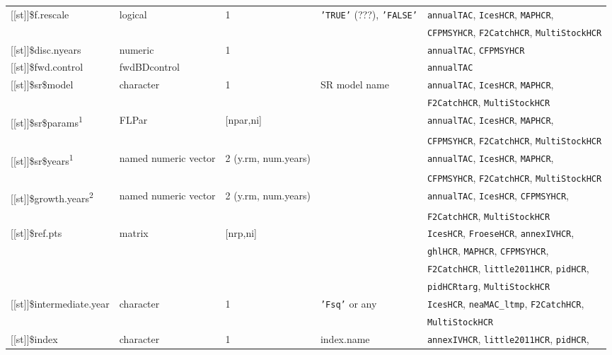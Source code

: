 \begin{landscape}
\begin{table}[!ht]
\begin{footnotesize}
\begin{threeparttable}
\begin{tabular}{lllll}
        {[[st]]}\$f.rescale & logical & 1 & \texttt{'TRUE'} (???), \texttt{'FALSE'} & \texttt{annualTAC}, \texttt{IcesHCR}, \texttt{MAPHCR}, \\
         &  &  &  & \texttt{CFPMSYHCR}, \texttt{F2CatchHCR}, \texttt{MultiStockHCR} \\
        {[[st]]}\$disc.nyears & numeric & 1 &  & \texttt{annualTAC}, \texttt{CFPMSYHCR}  \\
        {[[st]]}\$fwd.control & fwdBDcontrol &  &  & \texttt{annualTAC}  \\
        {[[st]]}\$sr\$model & character &  1 & SR model name  & \texttt{annualTAC}, \texttt{IcesHCR}, \texttt{MAPHCR}, \\
         &  &  &  & \texttt{F2CatchHCR}, \texttt{MultiStockHCR} \\
        {[[st]]}\$sr\$params\textsuperscript{1} & FLPar & [npar,ni]  &  & \texttt{annualTAC}, \texttt{IcesHCR}, \texttt{MAPHCR}, \\
         &  &  &  & \texttt{CFPMSYHCR}, \texttt{F2CatchHCR}, \texttt{MultiStockHCR} \\
         {[[st]]}\$sr\$years\textsuperscript{1} & named numeric vector & 2 (y.rm, num.years) &  & \texttt{annualTAC}, \texttt{IcesHCR}, \texttt{MAPHCR}, \\
         &  &  &  & \texttt{CFPMSYHCR}, \texttt{F2CatchHCR}, \texttt{MultiStockHCR} \\
        {[[st]]}\$growth.years\textsuperscript{2} & named numeric vector & 2 (y.rm, num.years) &  & \texttt{annualTAC}, \texttt{IcesHCR}, \texttt{CFPMSYHCR}, \\
         &  &  &  & \texttt{F2CatchHCR}, \texttt{MultiStockHCR} \\
        {[[st]]}\$ref.pts & matrix & [nrp,ni] &  & \texttt{IcesHCR}, \texttt{FroeseHCR}, \texttt{annexIVHCR}, \\
         &  &  &  & \texttt{ghlHCR}, \texttt{MAPHCR}, \texttt{CFPMSYHCR}, \\
         &  &  &  & \texttt{F2CatchHCR}, \texttt{little2011HCR}, \texttt{pidHCR}, \\
         &  &  &  & \texttt{pidHCRtarg}, \texttt{MultiStockHCR} \\
        {[[st]]}\$intermediate.year & character & 1 & \texttt{'Fsq'} or any &  \texttt{IcesHCR}, \texttt{neaMAC\_ltmp}, \texttt{F2CatchHCR}, \\
         &  &  &  & \texttt{MultiStockHCR} \\
        {[[st]]}\$index & character & 1 & index.name & \texttt{annexIVHCR}, \texttt{little2011HCR}, \texttt{pidHCR}, \\

\end{tabular}
\end{threeparttable}
\end{footnotesize}
\end{table}
\end{landscape}
